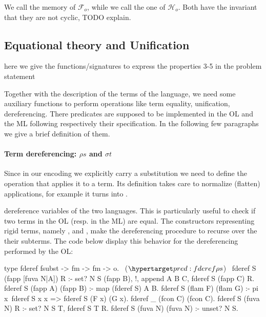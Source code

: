 \documentclass[sigconf,natbib=false]{acmart}
\newcommand{\Fo}{\ensuremath{\mathcal{F}_{\!o}\xspace}} %
\newcommand{\Ho}{\ensuremath{\mathcal{H}_o}\xspace}
\begin{document}
\noindent
We call  the memory of \Fo{}, while we call 
the one of \Ho.
Both have the invariant that they are not cyclic, TODO explain.

\subsection{Equational theory and Unification}

here we give the functions/signatures to express the properties 3-5 in the problem
statement

Together with the description of the terms of the language, we need some
auxiliary functions to perform operations like term equality, unification,
dereferencing. There predicates are supposed to be implemented in the OL and the
ML following respectively their specification. In the following few paragraphs
we give a brief definition of them.

\paragraph{Term dereferencing: $\rho s$ and $\sigma t$}

Since in our encoding we explicitly carry a substitution we need to
define the operation that applies it to a term. Its definition
takes care to normalize (flatten) applications, for example
it turns
into
.


dereference variables of the two languages. This is particularly useful to check
if two terms in the OL (resp. in the ML) are equal. The constructors
representing rigid terms, namely ,  and ,
make the dereferencing procedure to recurse over the their subterms. The code
below display this behavior for the dereferencing performed by the OL:

\begin{elpicode}
type fderef fsubst -> fm -> fm -> o.                 ~($\customlabel{pred:fderef}{\rho s}$)~
fderef S (fapp [fuva N|A]) R :- set? N S (fapp B), !,
  append A B C, fderef S (fapp C) R.
fderef S (fapp A) (fapp B) :- map (fderef S) A B.
fderef S (flam F) (flam G) :- 
  pi x\ fderef S x x => fderef S (F x) (G x).
fderef _ (fcon C) (fcon C).
fderef S (fuva N) R :- set? N S T, fderef S T R.
fderef S (fuva N) (fuva N) :- unset? N S.
\end{elpicode}
\end{document}
